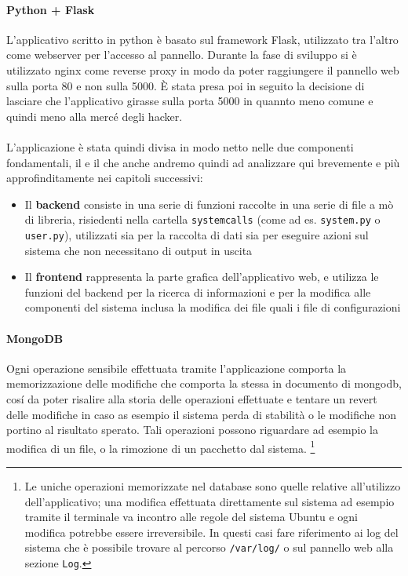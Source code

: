 \documentclass[11pt]{article}
\begin{document}
\paragraph{Python + Flask}
L'applicativo scritto in python è basato sul framework Flask, utilizzato tra l'altro come webserver per l'accesso al pannello.
Durante la fase di sviluppo si è utilizzato nginx come reverse proxy in modo da poter raggiungere il pannello web sulla porta 80 e non sulla 5000.
È stata presa poi in seguito la decisione di lasciare che l'applicativo girasse sulla porta 5000 in quannto meno comune e quindi
meno alla mercé degli hacker.
\\~\\
L'applicazione è stata quindi divisa in modo netto nelle due componenti fondamentali, il  e il 
che anche andremo quindi ad analizzare qui brevemente e più approfinditamente nei capitoli successivi:
\begin{itemize}
	\label{backendintro}
	\item{
			Il \textbf{backend} consiste in una serie di funzioni raccolte in una serie di file a mò di libreria,
			risiedenti nella cartella \texttt{systemcalls} (come ad es. \texttt{system.py} o \texttt{user.py}), utilizzati
			sia per la raccolta di dati sia per eseguire azioni sul sistema che non necessitano di output in uscita}
	\label{frontendintro}
	\item{
			Il \textbf{frontend} rappresenta la parte grafica dell'applicativo web, e utilizza le funzioni
			del backend per la ricerca di informazioni e per la modifica alle componenti del sistema
			inclusa la modifica dei file quali i file di configurazioni}
\end{itemize}

\paragraph{MongoDB}
Ogni operazione sensibile effettuata tramite l'applicazione comporta la memorizzazione delle modifiche che comporta la stessa
in documento di mongodb, cos\'i da poter risalire alla storia delle operazioni effettuate e tentare un revert delle modifiche
in caso as esempio il sistema perda di stabilità o le modifiche non portino al risultato sperato.
Tali operazioni possono riguardare ad esempio la modifica di un file, o la rimozione di un pacchetto dal sistema.
\footnote{\label{loglimit1}
Le uniche operazioni memorizzate nel database sono quelle relative all'utilizzo dell'applicativo;
una modifica effettuata direttamente sul sistema ad esempio tramite il terminale va incontro alle regole del sistema Ubuntu
e ogni modifica potrebbe essere irreversibile. In questi casi fare riferimento ai log del sistema che è possibile trovare
al percorso \texttt{/var/log/} o sul pannello web alla sezione \texttt{Log}. }
\end{document}
